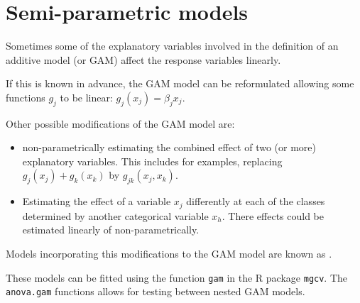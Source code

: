 \pagebreak
\section{Semi-parametric models}

Sometimes some of the explanatory variables involved in the
definition of an additive model (or GAM)
affect the response variables linearly.

If this is known in advance, the GAM model can be reformulated
allowing some functions $g_j$ to be linear:
$g_j(x_j) = \beta_j x_j$.

Other possible modifications of the GAM model are:
\begin{itemize}
    \item non-parametrically estimating the combined effect of two (or more)
        explanatory variables. This includes for examples, replacing
        $g_j(x_j) + g_k(x_k)$ by $g_{jk}(x_j, x_k)$.
    \item Estimating the effect of a variable $x_j$ differently at each of the
        classes determined by another categorical variable $x_h$. There
        effects could be estimated linearly of non-parametrically.
\end{itemize}

Models incorporating this modifications to the GAM model are known as
.

These models can be fitted using the function \texttt{gam} in the R package
\texttt{mgcv}. The \texttt{anova.gam} functions allows for testing between
nested GAM models.
